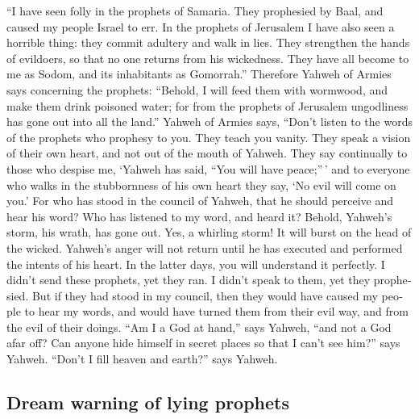 \begin{paracol}{2}
\begin{otherlanguage}{english}
 ``I have seen folly in the prophets of Samaria. They
prophesied by Baal, and caused my people Israel to err. 
In the prophets of Jerusalem I have also seen a horrible thing: they
commit adultery and walk in lies. They strengthen the hands of
evildoers, so that no one returns from his wickedness. They have all
become to me as Sodom, and its inhabitants as Gomorrah.''
 Therefore Yahweh of Armies says concerning the prophets:
``Behold, I will feed them with wormwood, and make them drink poisoned
water; for from the prophets of Jerusalem ungodliness has gone out into
all the land.''  Yahweh of Armies says, ``Don't listen to
the words of the prophets who prophesy to you. They teach you vanity.
They speak a vision of their own heart, and not out of the mouth of
Yahweh.  They say continually to those who despise me,
`Yahweh has said, ``You will have peace;''\,' and to everyone who walks
in the stubbornness of his own heart they say, `No evil will come on
you.'  For who has stood in the council of Yahweh, that
he should perceive and hear his word? Who has listened to my word, and
heard it?  Behold, Yahweh's storm, his wrath, has gone
out. Yes, a whirling storm! It will burst on the head of the wicked.
 Yahweh's anger will not return until he has executed and
performed the intents of his heart. In the latter days, you will
understand it perfectly.  I didn't send these prophets,
yet they ran. I didn't speak to them, yet they prophesied.
 But if they had stood in my council, then they would
have caused my people to hear my words, and would have turned them from
their evil way, and from the evil of their doings.  ``Am
I a God at hand,'' says Yahweh, ``and not a God afar off?
 Can anyone hide himself in secret places so that I can't
see him?'' says Yahweh. ``Don't I fill heaven and earth?'' says Yahweh.

\hypertarget{dream-warning-of-lying-prophets}{%
\subsection{Dream warning of lying
prophets}\label{dream-warning-of-lying-prophets}}


\end{otherlanguage}
\end{paracol}
